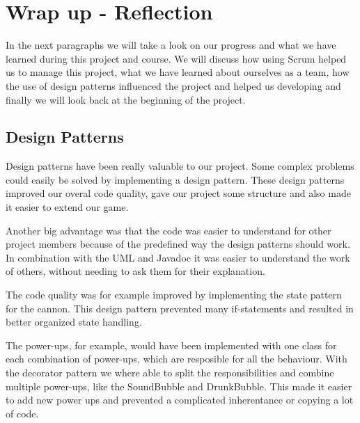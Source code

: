 \documentclass[a4paper]{article}
\begin{document}


\clearpage
\section{Wrap up - Reflection}

In the next paragraphs we will take a look on our progress and what we have learned during this project and course. We will discuss how using Scrum helped us to manage this project, what we have learned about ourselves as a team, how the use of design patterns influenced the project and helped us developing and finally we will look back at the beginning of the project.

\subsection{Design Patterns}
Design patterns have been really valuable to our project. Some complex problems could easily be solved by implementing a design pattern. These design patterns improved our overal code quality, gave our project some structure and also made it easier to extend our game.

Another big advantage was that the code was easier to understand for other project members because of the predefined way the design patterns should work. In combination with the UML and Javadoc it was easier to understand the work of others, without needing to ask them for their explanation.

The code quality was for example improved by implementing the state pattern for the cannon. This design pattern prevented many if-statements and resulted in better organized state handling.

The power-ups, for example, would have been implemented with one class for each combination of power-ups, which are resposible for all the behaviour. With the decorator pattern we where able to split the responsibilities and combine multiple power-ups, like the SoundBubble and DrunkBubble. This made it easier to add new power ups and prevented a complicated inherentance or copying a lot of code.
\end{document}

